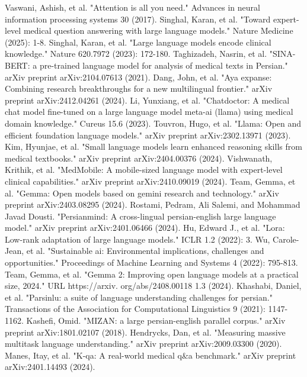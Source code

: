 \documentclass[conference]{IEEEtran}
\begin{document}
\begin{thebibliography}{00}
 Vaswani, Ashish, et al. "Attention is all you need." Advances in neural information processing systems 30 (2017).
 Singhal, Karan, et al. "Toward expert-level medical question answering with large language models." Nature Medicine (2025): 1-8.
Singhal, Karan, et al. "Large language models encode clinical knowledge." Nature 620.7972 (2023): 172-180.
 Taghizadeh, Nasrin, et al. "SINA-BERT: a pre-trained language model for analysis of medical texts in Persian." arXiv preprint arXiv:2104.07613 (2021).
 Dang, John, et al. "Aya expanse: Combining research breakthroughs for a new multilingual frontier." arXiv preprint arXiv:2412.04261 (2024).
 Li, Yunxiang, et al. "Chatdoctor: A medical chat model fine-tuned on a large language model meta-ai (llama) using medical domain knowledge." Cureus 15.6 (2023).
 Touvron, Hugo, et al. "Llama: Open and efficient foundation language models." arXiv preprint arXiv:2302.13971 (2023).
 Kim, Hyunjae, et al. "Small language models learn enhanced reasoning skills from medical textbooks." arXiv preprint arXiv:2404.00376 (2024).
 Vishwanath, Krithik, et al. "MedMobile: A mobile-sized language model with expert-level clinical capabilities." arXiv preprint arXiv:2410.09019 (2024).
 Team, Gemma, et al. "Gemma: Open models based on gemini research and technology." arXiv preprint arXiv:2403.08295 (2024).
 Rostami, Pedram, Ali Salemi, and Mohammad Javad Dousti. "Persianmind: A cross-lingual persian-english large language model." arXiv preprint arXiv:2401.06466 (2024).
 Hu, Edward J., et al. "Lora: Low-rank adaptation of large language models." ICLR 1.2 (2022): 3.
 Wu, Carole-Jean, et al. "Sustainable ai: Environmental implications, challenges and opportunities." Proceedings of Machine Learning and Systems 4 (2022): 795-813.
 Team, Gemma, et al. "Gemma 2: Improving open language models at a practical size, 2024." URL https://arxiv. org/abs/2408.00118 1.3 (2024).
 Khashabi, Daniel, et al. "Parsinlu: a suite of language understanding challenges for persian." Transactions of the Association for Computational Linguistics 9 (2021): 1147-1162.
 Kashefi, Omid. "MIZAN: a large persian-english parallel corpus." arXiv preprint arXiv:1801.02107 (2018).
 Hendrycks, Dan, et al. "Measuring massive multitask language understanding." arXiv preprint arXiv:2009.03300 (2020).
 Manes, Itay, et al. "K-qa: A real-world medical q\&a benchmark." arXiv preprint arXiv:2401.14493 (2024).
\end{thebibliography}
\end{document}
